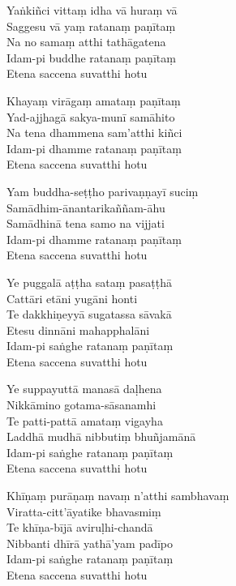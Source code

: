 \begin{paritta}

Yaṅkiñci vittaṃ idha vā huraṃ vā\\
Saggesu vā yaṃ ratanaṃ paṇītaṃ\\
Na no samaṃ atthi tathāgatena\\
Idam-pi buddhe ratanaṃ paṇītaṃ\\
Etena saccena suvatthi hotu

Khayaṃ virāgaṃ amataṃ paṇītaṃ\\
Yad-ajjhagā sakya-munī samāhito\\
Na tena dhammena sam'atthi kiñci\\
Idam-pi dhamme ratanaṃ paṇītaṃ\\
Etena saccena suvatthi hotu

Yam buddha-seṭṭho parivaṇṇayī suciṃ\\
Samādhim-ānantarikaññam-āhu\\
Samādhinā tena samo na vijjati\\
Idam-pi dhamme ratanaṃ paṇītaṃ\\
Etena saccena suvatthi hotu

Ye puggalā aṭṭha sataṃ pasaṭṭhā\\
Cattāri etāni yugāni honti\\
Te dakkhiṇeyyā sugatassa sāvakā\\
Etesu dinnāni mahapphalāni\\
Idam-pi saṅghe ratanaṃ paṇītaṃ\\
Etena saccena suvatthi hotu

\clearpage

Ye suppayuttā manasā daḷhena\\
Nikkāmino gotama-sāsanamhi\\
Te patti-pattā amataṃ vigayha\\
Laddhā mudhā nibbutiṃ bhuñjamānā\\
Idam-pi saṅghe ratanaṃ paṇītaṃ\\
Etena saccena suvatthi hotu

Khīṇaṃ purāṇaṃ navaṃ n'atthi sambhavaṃ\\
Viratta-citt'āyatike bhavasmiṃ\\
Te khīṇa-bījā aviruḷhi-chandā\\
Nibbanti dhīrā yathā'yam padīpo\\
Idam-pi saṅghe ratanaṃ paṇītaṃ\\
Etena saccena suvatthi hotu


\end{paritta}

